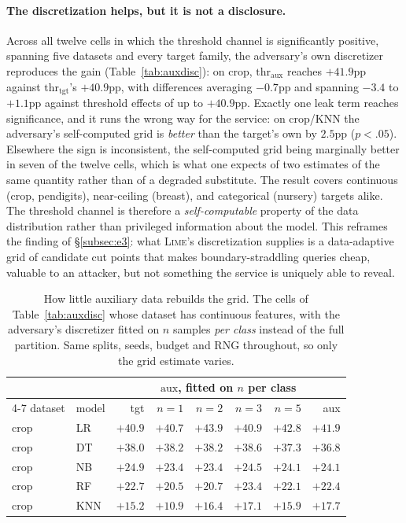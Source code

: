 \documentclass[sigconf,anonymous,review]{acmart}
\begin{document}
\paragraph{The discretization helps, but it is not a disclosure.} Across all twelve cells in which the
threshold channel is significantly positive, spanning five datasets and every target family, the adversary's own discretizer reproduces the gain (Table~\ref{tab:auxdisc}): on crop,
$\text{thr}_{\text{aux}}$ reaches $+41.9$pp against $\text{thr}_{\text{tgt}}$'s $+40.9$pp, with
differences averaging $-0.7$pp and spanning $-3.4$ to $+1.1$pp against threshold effects of up to
$+40.9$pp. Exactly one leak term reaches significance, and it runs the wrong way for the service:
on crop/KNN the adversary's self-computed grid is \emph{better} than the target's own by $2.5$pp
($p{<}.05$). Elsewhere the sign is inconsistent, the self-computed grid being marginally better in
seven of the twelve cells, which is what one expects of two estimates of the same quantity rather
than of a degraded substitute.
The result covers continuous (crop, pendigits), near-ceiling (breast), and categorical (nursery) targets alike. The threshold channel is therefore a
\emph{self-computable} property of the data distribution rather than privileged information about the
model. This reframes the finding of \S\ref{subsec:e3}: what \textsc{Lime}'s discretization supplies is
a data-adaptive grid of candidate cut points that makes boundary-straddling queries cheap, valuable to an attacker, but not something the service is uniquely able to reveal.

\begin{table}[t]
\centering
\setlength{\tabcolsep}{4pt}
\caption{How little auxiliary data rebuilds the grid. The cells of Table~\ref{tab:auxdisc} whose
dataset has continuous features, with the adversary's discretizer fitted on $n$ samples \emph{per
class} instead of the full partition. Same splits, seeds, budget and RNG throughout, so only the
grid estimate varies.}
\label{tab:auxsize-crop}
\begin{tabular}{llrrrrrr}
\toprule
 & & & \multicolumn{4}{c}{$\text{aux}$, fitted on $n$ per class} & \\
\cmidrule(lr){4-7}
dataset & model & tgt & $n{=}1$ & $n{=}2$ & $n{=}3$ & $n{=}5$ & aux \\
\midrule
crop      & LR  & $+40.9$ & $+40.7$ & $+43.9$ & $+40.9$ & $+42.8$ & $+41.9$ \\
crop      & DT  & $+38.0$ & $+38.2$ & $+38.2$ & $+38.6$ & $+37.3$ & $+36.8$ \\
crop      & NB  & $+24.9$ & $+23.4$ & $+23.4$ & $+24.5$ & $+24.1$ & $+24.1$ \\
crop      & RF  & $+22.7$ & $+20.5$ & $+20.7$ & $+23.4$ & $+22.1$ & $+22.4$ \\
crop      & KNN & $+15.2$ & $+10.9$ & $+16.4$ & $+17.1$ & $+15.9$ & $+17.7$ \\
\bottomrule
\end{tabular}
\end{table}
\end{document}
